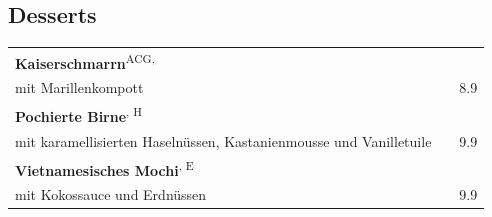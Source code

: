 \documentclass[a4paper,12pt]{article}
\newcommand{\vegan}{\textbf{\scriptsize \color{vegan}{Vegan}}}
\newcommand{\vegetarisch}{\textbf{\scriptsize \color{vegan}{Veg}}}
\begin{document}
\begin{multicols}{2}
\section*{Desserts}
\begin{tabular}{Lrr}
\textbf{Kaiserschmarrn}\textsuperscript{{\scriptsize ACG, \vegetarisch}}\\
\hspace{0.4cm}\scriptsize mit Marillenkompott & & 8.9\\
\textbf{Pochierte Birne}\textsuperscript{{\scriptsize \vegan, H}}\\
\hspace{0.4cm}\scriptsize mit karamellisierten Haselnüssen, Kastanienmousse und Vanilletuile & & 9.9\\
\textbf{Vietnamesisches Mochi}\textsuperscript{{\scriptsize \vegan, E}}\\
\hspace{0.4cm}\scriptsize mit Kokossauce und Erdnüssen & & 9.9 \\
\end{tabular}





\end{multicols}
\end{document}
